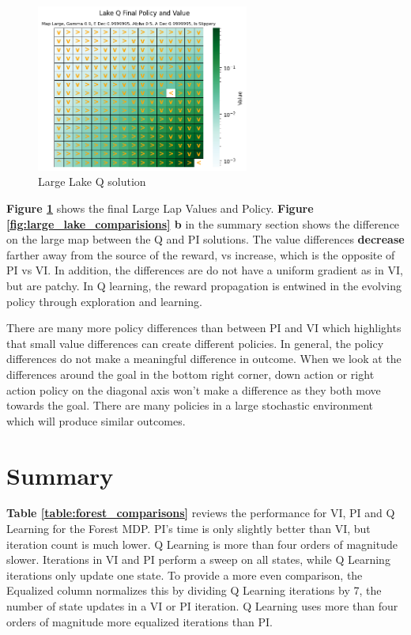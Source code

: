\documentclass[letterpaper]{article} %
\begin{document}
\begin{figure}[!htb]
\centering
\includegraphics[width=2.75in]{Figures/Lake_Q_Final_Policy_and_Value_Map_Large__Gamma_0_9__E_Dec_0_9999995__Alpha_0_5__A_Dec_0_9999995__Is_Slippery.png}
\caption{Large Lake Q solution}
\label{fig:lake_q_large_solution}
\end{figure}

\textbf{Figure \ref{fig:lake_q_large_solution}} shows the final Large Lap Values and Policy.   \textbf{Figure \ref{fig:large_lake_comparisions} b} in the summary section shows the difference on the large map between the Q and PI solutions.  The value differences \textbf{decrease} farther away from the source of the reward, vs increase, which is the opposite of PI vs VI.  In addition, the differences are do not have a uniform gradient as in VI, but are patchy.  In Q learning, the reward propagation is entwined in the evolving policy through exploration and learning. 

There are many more policy differences than between PI and VI which highlights that small value differences can create different policies.  In general, the policy differences do not make a meaningful difference in outcome.  When we look at the differences around the goal in the bottom right corner,  down action or right action policy on the diagonal axis won't make a difference as they both move towards the goal.  There are many policies in a large stochastic environment which will produce similar outcomes.

\section{Summary}

\textbf{Table \ref{table:forest_comparisons}} reviews the performance for VI, PI and Q Learning for the Forest MDP.  PI's time is only slightly better than VI, but iteration count is much lower.  Q Learning is more than four orders of magnitude slower.  Iterations in VI and PI perform a sweep on all states, while Q Learning iterations only update one state.  To provide a more even comparison, the Equalized column normalizes this by dividing Q Learning iterations by 7, the number of state updates in a VI or PI iteration.  Q Learning uses more than four orders of magnitude more equalized iterations than PI.
\end{document}
